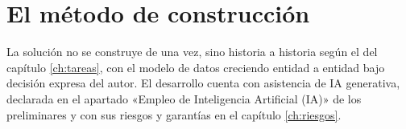 \section{El método de construcción}
\label{sec:solucion-metodo}

La solución no se construye de una vez, sino historia a historia según el  del capítulo \ref{ch:tareas}, con el modelo de datos creciendo entidad a entidad bajo decisión expresa del autor.
El desarrollo cuenta con asistencia de \ac{IA} generativa, declarada en el apartado «Empleo de Inteligencia Artificial (IA)» de los preliminares y con sus riesgos y garantías en el capítulo \ref{ch:riesgos}.
